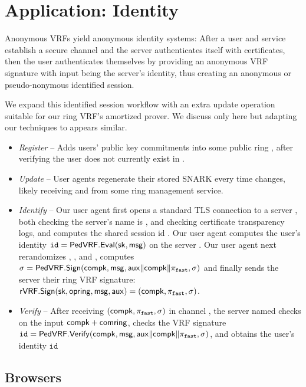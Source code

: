 \section{Application: Identity}
\label{sec:app_identity}

Anonymous VRFs yield anonymous identity systems:
After a user and service establish a secure channel and
the server authenticates itself with certificates, then
the user authenticates themselves by providing an anonymous
VRF signature with input \msg being the server's identity,
thus creating an anonymous or pseudo-nonymous identified session.

We expand this identified session workflow with an extra
update operation suitable for our ring VRF's amortized prover.
We discuss only \pifast here but adapting our techniques to \pisafe appears similar. 

\begin{itemize}
\item {\em Register} --
 Adds users' public key commitments into some public ring \ctx,
 after verifying the user does not currently exist in \ctx.
\item {\em Update} --
 User agents regenerate their stored SNARK \pifast every time \ctx changes,
 likely receiving \comring and \openring from some ring management service.
\item {\em Identify} --
 Our user agent first opens a standard TLS connection to a server \msg,
 both checking the server's name is \msg, and checking certificate
 transparency logs, and computes the shared session id \aux.
 Our user agent computes the user's identity
  $\mathtt{id} = {\mathsf{PedVRF}}.{\mathsf{Eval}}(\mathsf{sk},\mathsf{msg})$ on the server \msg.
 Our user agent next rerandomizes \pifast, \compk, and \openpk, computes
 $\sigma = {\mathsf{PedVRF}}.{\mathsf{Sign}}(\mathsf{compk},\mathsf{msg},\mathsf{aux} \| \mathsf{compk} \| \pi_{\mathtt{fast}},\sigma)$
 and finally sends the server their ring VRF signature:
 ${\mathsf{rVRF}}.{\mathsf{Sign}}(\mathsf{sk},\mathsf{opring},\mathsf{msg},\mathsf{aux}) = (\mathsf{compk},\pi_{\mathtt{fast}},\sigma)$.
\item {\em Verify} -- 
 After receiving $(\mathsf{compk},\pi_{\mathtt{fast}},\sigma)$ in channel \aux,
 the server named \msg checks \pifast on the input $\mathsf{compk} + \mathsf{comring}$,
 checks the VRF signature
 $\mathtt{id} = {\mathsf{PedVRF}}.{\mathsf{Verify}}(\mathsf{compk},\mathsf{msg},\mathsf{aux} \| \mathsf{compk} \| \pi_{\mathtt{fast}},\sigma)$,
 and obtains the user's identity $\mathtt{id}$
\end{itemize}


\subsection{Browsers}

